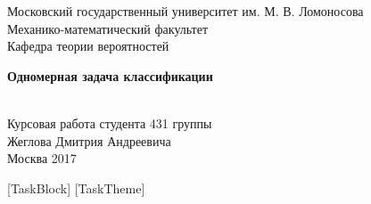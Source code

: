 \documentclass[12 pt, russian]{article}
\begin{document}
\begin{center} 
Московский государственный университет им. М. В. Ломоносова \\ 
Механико-математический факультет \\ 
Кафедра теории вероятностей \\ 
\end{center} 

\vspace{200pt} 

\begin{center} 
\begin{LARGE} {\bf Одномерная задача классификации } \end{LARGE} \\ 

\vspace{25pt} 
Курсовая работа студента 431 группы \\ 
Жеглова Дмитрия Андреевича \\ 
Москва 2017 \pagebreak
\end{center}
[TaskBlock]
[TaskTheme]
\newcommand{\NewBlock}[1]{\refstepcounter{TaskBlock}\section*{\arabic{TaskBlock}. #1}}
\newcommand{\NewTheme}[1]{\refstepcounter{TaskTheme}\subsection*{\arabic{TaskBlock}.\arabic{TaskTheme}. #1}}
\newcommand{\num}{\refstepcounter{TaskTask} {\bf \arabic{TaskBlock}.\arabic{TaskTheme}.\arabic{TaskTask}} }
\end{document}
